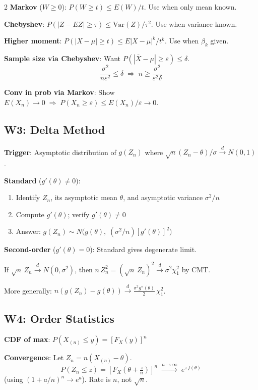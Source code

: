\documentclass[8pt]{extarticle}
\begin{document}
\begin{multicols}{2}
\textbf{Markov} ($W\ge 0$): $P(W\ge t) \le E(W)/t$. Use when only mean known.

\textbf{Chebyshev}: $P(|Z-EZ|\ge \tau) \le \text{Var}(Z)/\tau^2$. Use when variance known.

\textbf{Higher moment}: $P(|X-\mu|\ge t) \le E|X-\mu|^k / t^k$. Use when $\beta_k$ given.

\textbf{Sample size via Chebyshev}: Want $P(|\bar X - \mu|\ge\varepsilon)\le\delta$.
$$\frac{\sigma^2}{n\varepsilon^2}\le\delta \;\Longrightarrow\; \boxed{n \ge \frac{\sigma^2}{\varepsilon^2\delta}}$$

\textbf{Conv in prob via Markov}: Show $E(X_n)\to 0 \;\Rightarrow\; P(X_n\ge\varepsilon)\le E(X_n)/\varepsilon\to 0$.

\subsection{W3: Delta Method}

\textbf{Trigger}: Asymptotic distribution of $g(Z_n)$ where $\sqrt{n}(Z_n-\theta)/\sigma \xrightarrow{d} N(0,1)$.

\textbf{Standard} ($g'(\theta)\ne 0$):
\begin{enumerate}
\item Identify $Z_n$, its asymptotic mean $\theta$, and asymptotic variance $\sigma^2/n$
\item Compute $g'(\theta)$; verify $g'(\theta)\ne 0$
\item Answer: $g(Z_n) \sim N\!\big(g(\theta),\; (\sigma^2/n)[g'(\theta)]^2\big)$
\end{enumerate}

\textbf{Second-order} ($g'(\theta)=0$): Standard gives degenerate limit.

If $\sqrt{n}\,Z_n \xrightarrow{d} N(0,\sigma^2)$, then $n\,Z_n^2 = (\sqrt{n}\,Z_n)^2 \xrightarrow{d} \sigma^2\chi^2_1$ by CMT.

More generally: $n(g(Z_n)-g(\theta)) \xrightarrow{d} \tfrac{\sigma^2 g''(\theta)}{2}\,\chi^2_1$.

\subsection{W4: Order Statistics}

\textbf{CDF of max}: $P(X_{(n)}\le y) = [F_X(y)]^n$

\textbf{Convergence}: Let $Z_n = n(X_{(n)}-\theta)$.
$$P(Z_n\le z) = \left[F_X\!\left(\theta + \tfrac{z}{n}\right)\right]^n \;\xrightarrow{n\to\infty}\; e^{z\,f(\theta)}$$
(using $(1+a/n)^n\to e^a$). Rate is $n$, not $\sqrt{n}$.


\end{multicols}
\end{document}
